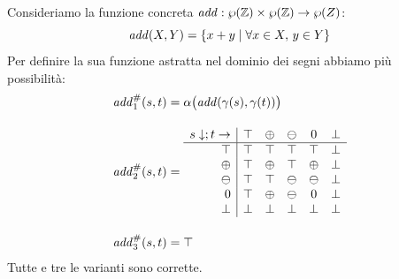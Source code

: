 \begin{example}
Consideriamo la funzione concreta $\mathit{add} : \wp(\mathbb{Z}) \times \wp(\mathbb{Z}) \to \wp(Z)$:
\[ \mathit{add}(X, Y) = \{ x + y \mid \forall x \in X, \, y \in Y \} \]
Per definire la sua funzione astratta nel dominio dei segni abbiamo più possibilità:
\begin{align*}
    \mathit{add}^{\#}_1(s, t) 
    & = \alpha\big(\mathit{add}(\gamma(s), \gamma(t)) \big) \\[1em]
    \mathit{add}^{\#}_2(s,t) 
    & = \begin{array}{r|ccccc}
        s \downarrow; t \rightarrow & \top & \oplus & \ominus & 0       & \bot  \\\hline
        \top                      & \top   & \top   & \top    & \top    & \bot  \\
        \oplus                    & \top   & \oplus & \top    & \oplus  & \bot  \\
        \ominus                   & \top   & \top   & \ominus & \ominus & \bot  \\
        0                         & \top   & \oplus & \ominus & 0       & \bot  \\
        \bot                      & \bot   & \bot   & \bot    & \bot    & \bot  \\
    \end{array} \\[1em]
    \mathit{add}^{\#}_3(s,t) 
    & = \top
\end{align*}
Tutte e tre le varianti sono corrette. 
\end{example}









